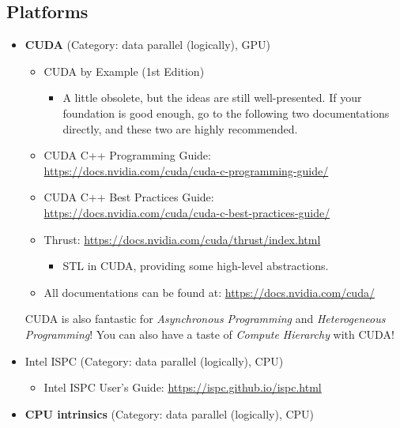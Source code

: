 \documentclass{article}
\begin{document}
\subsection{Platforms}
\begin{itemize}
    \item \textbf{CUDA} (Category: data parallel (logically), GPU)
    \begin{itemize}
        \item CUDA by Example (1st Edition) \cite{sanders2010cuda}
        \begin{itemize}
            \item A little obsolete, but the ideas are still well-presented.
            If your foundation is good enough, go to the following two documentations directly, and these two are highly recommended.
        \end{itemize}
        \item CUDA C++ Programming Guide:\\
        \href{https://docs.nvidia.com/cuda/cuda-c-programming-guide/}{https://docs.nvidia.com/cuda/cuda-c-programming-guide/}
        \item CUDA C++ Best Practices Guide:\\
        \href{https://docs.nvidia.com/cuda/cuda-c-best-practices-guide/}{https://docs.nvidia.com/cuda/cuda-c-best-practices-guide/}
        \item Thrust:
        \href{https://docs.nvidia.com/cuda/thrust/index.html}{https://docs.nvidia.com/cuda/thrust/index.html}
            \begin{itemize}
                \item STL in CUDA, providing some high-level abstractions.
            \end{itemize}
        \item All documentations can be found at:
        \href{https://docs.nvidia.com/cuda/}{https://docs.nvidia.com/cuda/}
    \end{itemize}
    CUDA is also fantastic for \emph{Asynchronous Programming} and \emph{Heterogeneous Programming}!
    You can also have a taste of \emph{Compute Hierarchy} with CUDA!
    \item Intel ISPC (Category: data parallel (logically), CPU)
    \begin{itemize}
        \item Intel ISPC User's Guide:
        \href{https://ispc.github.io/ispc.html}{https://ispc.github.io/ispc.html}
    \end{itemize}
    \item \textbf{CPU intrinsics} (Category: data parallel (logically), CPU)

\end{itemize}
\end{document}
